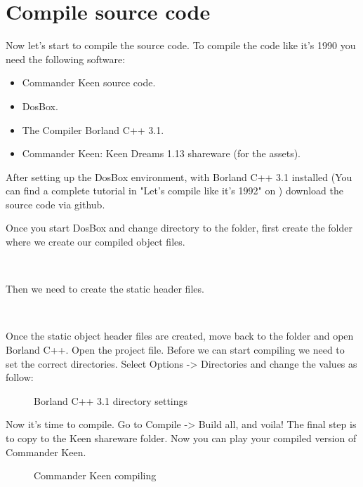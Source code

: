 \documentclass[book.tex]{subfiles}
\begin{document}
\section{Compile source code}
Now let's start to compile the source code. To compile the code like it's 1990 you need the following software:
\begin{itemize}
\item Commander Keen source code.
\item DosBox.
\item The Compiler Borland C++ 3.1.
\item Commander Keen: Keen Dreams 1.13 shareware (for the assets).
\end{itemize}

After setting up the DosBox environment, with Borland C++ 3.1 installed (You can find a complete tutorial in "Let's compile like it's 1992" on ) download the source code via github.\\

\par
Once you start DosBox and change directory to the  folder, first create the folder where we create our compiled object files.\\
\par
{}\\
\par
Then we need to create the static  header files.\\
\par
{}\\
\par
Once the static object header files are created, move back to the  folder and open Borland C++. Open the  project file. Before we can start compiling we need to set the correct directories. Select Options -> Directories and change the values as follow:
\begin{figure}[H]
\centering
\caption{Borland C++ 3.1 directory settings}
\end{figure}
\par
Now it's time to compile. Go to Compile -> Build all, and voila! The final step is to copy  to the Keen shareware folder. Now you can play your compiled version of Commander Keen.
 \begin{figure}[H]
\centering
\caption{Commander Keen compiling}
\end{figure}
\par
\end{document}
